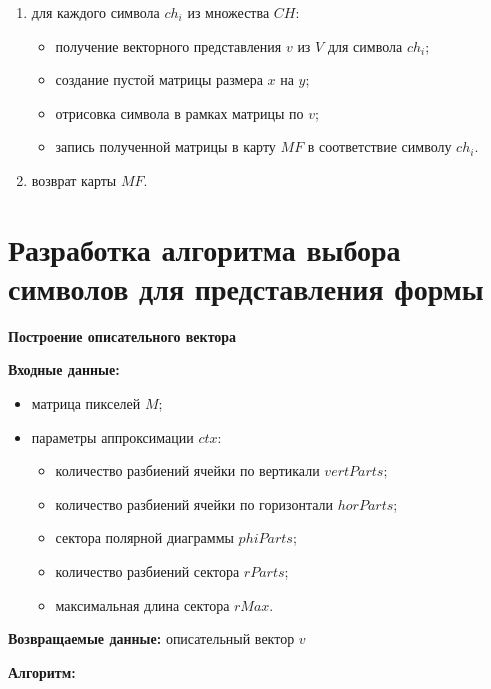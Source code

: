 \begin{enumerate}
    \item для каждого символа $ch_i$ из множества $CH$:
    \begin{itemize}
        \item получение векторного представления $v$ из $V$ для символа $ch_i$;
        \item создание пустой матрицы размера $x$ на $y$;
        \item отрисовка символа в рамках матрицы по $v$;
        \item запись полученной матрицы в карту $MF$ в соответствие символу $ch_i$.
    \end{itemize}
    \item возврат карты $MF$.
\end{enumerate}

\section{Разработка алгоритма выбора символов для представления формы}

\textbf{Построение описательного вектора}

\textbf{Входные данные:}
\begin{itemize}
    \item матрица пикселей $M$;
    \item параметры аппроксимации $ctx$: 
    \begin{itemize}
        \item количество разбиений ячейки по вертикали $vertParts$;
        \item количество разбиений ячейки по горизонтали $horParts$;
        \item сектора полярной диаграммы $phiParts$;
        \item количество разбиений сектора $rParts$;
        \item максимальная длина сектора $rMax$.
    \end{itemize}
\end{itemize}

\textbf{Возвращаемые данные:} описательный вектор $v$

\textbf{Алгоритм:}

